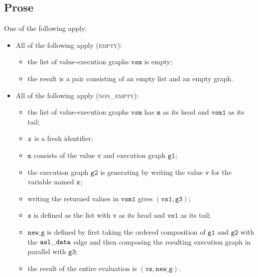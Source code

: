 \documentclass{book}
\newcommand\newg[0]{\texttt{new\_g}}
\newcommand\vm[0]{\texttt{m}}
\newcommand\vv[0]{\texttt{v}}
\newcommand\vs[0]{\texttt{s}}
\newcommand\vvs[0]{\texttt{vs}}
\newcommand\vvsone[0]{\texttt{vs1}}
\newcommand\vgone[0]{\texttt{g1}}
\newcommand\vgtwo[0]{\texttt{g2}}
\newcommand\vgthree[0]{\texttt{g3}}
\newcommand\vvsm[0]{\texttt{vsm}}
\newcommand\vvsmone[0]{\texttt{vsm1}}
\begin{document}
\subsection{Prose}
  One of the following apply:
  \begin{itemize}
  \item All of the following apply (\textsc{empty}):
  \begin{itemize}
    \item the list of value-execution graphs $\vvsm$ is empty;
    \item the result is a pair consisting of an empty list and an empty graph.
  \end{itemize}

  \item All of the following apply (\textsc{non\_empty}):
  \begin{itemize}
    \item the list of value-execution graphs $\vvsm$ has $\vm$ as its head and $\vvsmone$ as its tail;
    \item $\texttt{x}$ is a fresh identifier;
    \item $\vm$ consists of the value $\vv$ and execution graph $\vgone$;
    \item the execution graph $\vgtwo$ is generating by writing the value $\vv$ for the variable named $\texttt{x}$;
    \item writing the returned values in $\vvsmone$ gives $(\vvsone, \vgthree)$;
    \item $\vs$ is defined as the list with $\vv$ as its head and $\vvsone$ as its tail;
    \item $\newg$ is defined by first taking the ordered composition of $\vgone$ and $\vgtwo$ with the $\mathtt{asl\_data}$ edge
    and then composing the resulting execution graph in parallel with $\vgthree$;
    \item the result of the entire evaluation is $(\vvs, \newg)$.
  \end{itemize}
\end{itemize}

\end{document}
